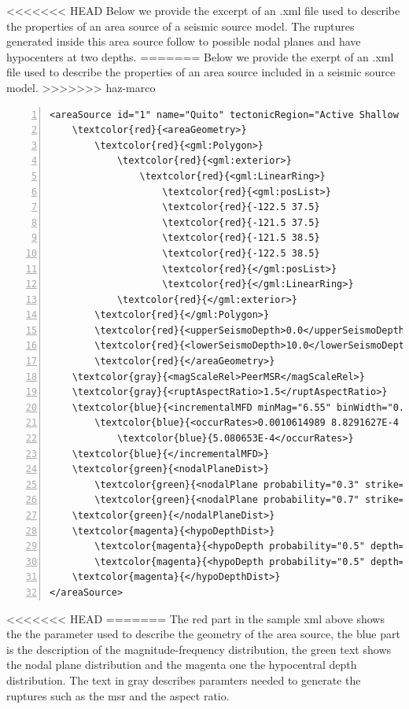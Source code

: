 <<<<<<< HEAD
Below we provide the excerpt of an .xml file used to describe the 
properties of an area source of a seismic source model.
The ruptures generated inside this area source follow to possible nodal 
planes and have hypocenters at two depths. 
=======
Below we provide the exerpt of an .xml file used to describe the properties of
an area source included in a seismic source model.
>>>>>>> haz-marco
\begin{Verbatim}[frame=single, commandchars=\\\{\}, fontsize=\footnotesize,
numbers=left, numbersep=2pt]
<areaSource id="1" name="Quito" tectonicRegion="Active Shallow Crust">
    \textcolor{red}{<areaGeometry>}
        \textcolor{red}{<gml:Polygon>}
            \textcolor{red}{<gml:exterior>}
                \textcolor{red}{<gml:LinearRing>}
                    \textcolor{red}{<gml:posList>}
                    \textcolor{red}{-122.5 37.5}
                    \textcolor{red}{-121.5 37.5}
                    \textcolor{red}{-121.5 38.5}
                    \textcolor{red}{-122.5 38.5}
                    \textcolor{red}{</gml:posList>}
                    \textcolor{red}{</gml:LinearRing>}
            \textcolor{red}{</gml:exterior>}
        \textcolor{red}{</gml:Polygon>}
        \textcolor{red}{<upperSeismoDepth>0.0</upperSeismoDepth>}
        \textcolor{red}{<lowerSeismoDepth>10.0</lowerSeismoDepth>}
        \textcolor{red}{</areaGeometry>}
    \textcolor{gray}{<magScaleRel>PeerMSR</magScaleRel>}
    \textcolor{gray}{<ruptAspectRatio>1.5</ruptAspectRatio>}
    \textcolor{blue}{<incrementalMFD minMag="6.55" binWidth="0.1">}
        \textcolor{blue}{<occurRates>0.0010614989 8.8291627E-4 7.3437777E-4 6.108288E-4}
		    \textcolor{blue}{5.080653E-4</occurRates>}
    \textcolor{blue}{</incrementalMFD>}
    \textcolor{green}{<nodalPlaneDist>}
        \textcolor{green}{<nodalPlane probability="0.3" strike="0.0" dip="90.0" rake="0.0"/>}
        \textcolor{green}{<nodalPlane probability="0.7" strike="90.0" dip="45.0" rake="90.0"/>}
    \textcolor{green}{</nodalPlaneDist>}
    \textcolor{magenta}{<hypoDepthDist>}
        \textcolor{magenta}{<hypoDepth probability="0.5" depth="4.0" />}
        \textcolor{magenta}{<hypoDepth probability="0.5" depth="8.0" />}
    \textcolor{magenta}{</hypoDepthDist>}
</areaSource>
\end{Verbatim}
<<<<<<< HEAD
=======
The red part in the sample xml above shows the the parameter used to 
describe the geometry of the area source, the blue part is the description
of the magnitude-frequency distribution, the green text shows the nodal 
plane distribution and the magenta one the hypocentral depth distribution.
The text in gray describes paramters needed to generate the ruptures 
such as the \gls{msr} and the aspect ratio.

